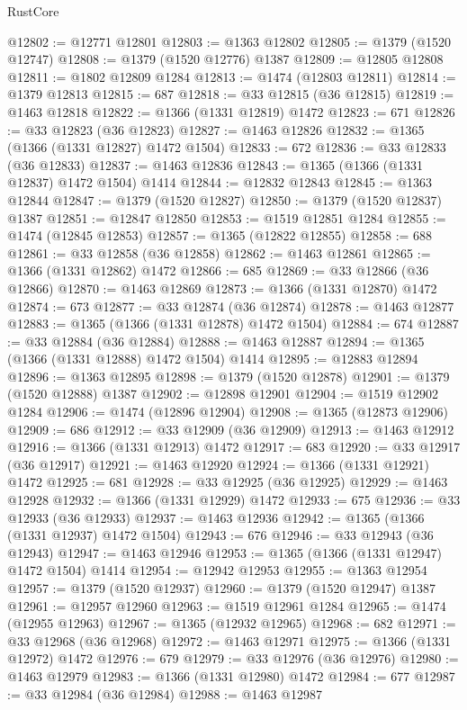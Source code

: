 \begin{lexlean}{RustCore}
\begin{coremodule}
@12802 := @12771 @12801
@12803 := @1363 @12802
@12805 := @1379 (@1520 @12747)
@12808 := @1379 (@1520 @12776) @1387
@12809 := @12805 @12808
@12811 := @1802 @12809 @1284
@12813 := @1474 (@12803 @12811)
@12814 := @1379 @12813
@12815 := 687
@12818 := @33 @12815 (@36 @12815)
@12819 := @1463 @12818
@12822 := @1366 (@1331 @12819) @1472
@12823 := 671
@12826 := @33 @12823 (@36 @12823)
@12827 := @1463 @12826
@12832 := @1365 (@1366 (@1331 @12827) @1472 @1504)
@12833 := 672
@12836 := @33 @12833 (@36 @12833)
@12837 := @1463 @12836
@12843 := @1365 (@1366 (@1331 @12837) @1472 @1504) @1414
@12844 := @12832 @12843
@12845 := @1363 @12844
@12847 := @1379 (@1520 @12827)
@12850 := @1379 (@1520 @12837) @1387
@12851 := @12847 @12850
@12853 := @1519 @12851 @1284
@12855 := @1474 (@12845 @12853)
@12857 := @1365 (@12822 @12855)
@12858 := 688
@12861 := @33 @12858 (@36 @12858)
@12862 := @1463 @12861
@12865 := @1366 (@1331 @12862) @1472
@12866 := 685
@12869 := @33 @12866 (@36 @12866)
@12870 := @1463 @12869
@12873 := @1366 (@1331 @12870) @1472
@12874 := 673
@12877 := @33 @12874 (@36 @12874)
@12878 := @1463 @12877
@12883 := @1365 (@1366 (@1331 @12878) @1472 @1504)
@12884 := 674
@12887 := @33 @12884 (@36 @12884)
@12888 := @1463 @12887
@12894 := @1365 (@1366 (@1331 @12888) @1472 @1504) @1414
@12895 := @12883 @12894
@12896 := @1363 @12895
@12898 := @1379 (@1520 @12878)
@12901 := @1379 (@1520 @12888) @1387
@12902 := @12898 @12901
@12904 := @1519 @12902 @1284
@12906 := @1474 (@12896 @12904)
@12908 := @1365 (@12873 @12906)
@12909 := 686
@12912 := @33 @12909 (@36 @12909)
@12913 := @1463 @12912
@12916 := @1366 (@1331 @12913) @1472
@12917 := 683
@12920 := @33 @12917 (@36 @12917)
@12921 := @1463 @12920
@12924 := @1366 (@1331 @12921) @1472
@12925 := 681
@12928 := @33 @12925 (@36 @12925)
@12929 := @1463 @12928
@12932 := @1366 (@1331 @12929) @1472
@12933 := 675
@12936 := @33 @12933 (@36 @12933)
@12937 := @1463 @12936
@12942 := @1365 (@1366 (@1331 @12937) @1472 @1504)
@12943 := 676
@12946 := @33 @12943 (@36 @12943)
@12947 := @1463 @12946
@12953 := @1365 (@1366 (@1331 @12947) @1472 @1504) @1414
@12954 := @12942 @12953
@12955 := @1363 @12954
@12957 := @1379 (@1520 @12937)
@12960 := @1379 (@1520 @12947) @1387
@12961 := @12957 @12960
@12963 := @1519 @12961 @1284
@12965 := @1474 (@12955 @12963)
@12967 := @1365 (@12932 @12965)
@12968 := 682
@12971 := @33 @12968 (@36 @12968)
@12972 := @1463 @12971
@12975 := @1366 (@1331 @12972) @1472
@12976 := 679
@12979 := @33 @12976 (@36 @12976)
@12980 := @1463 @12979
@12983 := @1366 (@1331 @12980) @1472
@12984 := 677
@12987 := @33 @12984 (@36 @12984)
@12988 := @1463 @12987

\end{coremodule}
\end{lexlean}
